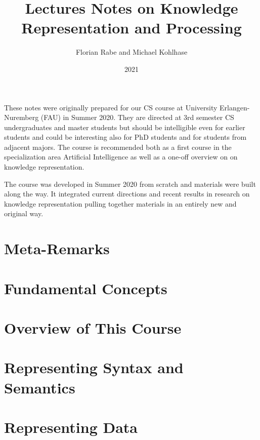 \documentclass{book}
\title{Lectures Notes on Knowledge Representation and Processing}
\author{Florian Rabe and Michael Kohlhase}
\date{2021}
\begin{document}
\maketitle

\bigskip

These notes were originally prepared for our CS course at University Erlangen-Nuremberg (FAU) in Summer 2020.
They are directed at 3rd semester CS undergraduates and master students but should be intelligible even for earlier students and could be interesting also for PhD students and for students from adjacent majors.
The course is recommended both as a first course in the specialization area Artificial Intelligence as well as a one-off overview on on knowledge representation.

The course was developed in Summer 2020 from scratch and materials were built along the way.
It integrated current directions and recent results in research on knowledge representation pulling together materials in an entirely new and original way.

\tableofcontents

\newpage

\chapter{Meta-Remarks}
  

\chapter{Fundamental Concepts}\label{sec:wuv:concepts}
  

\chapter{Overview of This Course}
  

\chapter{Representing Syntax and Semantics}\label{sec:wuv:syntax}
  

\chapter{Representing Data}\label{sec:wuv:codecs}
  
\end{document}
